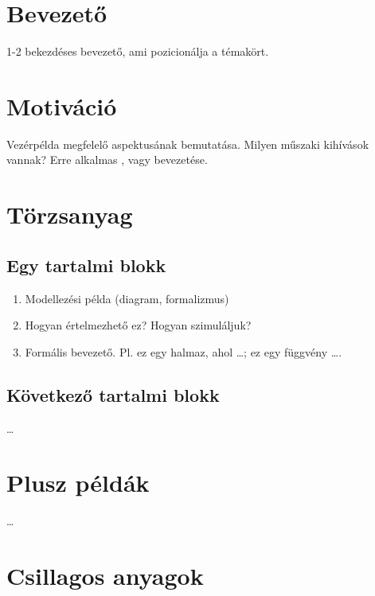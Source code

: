 
\section{Bevezető}

1-2 bekezdéses bevezető, ami pozicionálja a témakört.

\section{Motiváció}

Vezérpélda megfelelő aspektusának bemutatása. Milyen műszaki kihívások vannak? Erre alkalmas ,  vagy  bevezetése.

\section{Törzsanyag}

\subsection{Egy tartalmi blokk}

\begin{mdframed}
	\begin{enumerate}
	\item Modellezési példa (diagram, formalizmus)
	
	\item Hogyan értelmezhető ez? Hogyan szimuláljuk?
	
	\item Formális bevezető. Pl. ez egy halmaz, ahol \ldots; ez egy függvény \ldots.
	\end{enumerate}		
\end{mdframed}

\subsection{Következő tartalmi blokk}

\ldots

\section{Plusz példák}

\ldots

\section{Csillagos anyagok}

